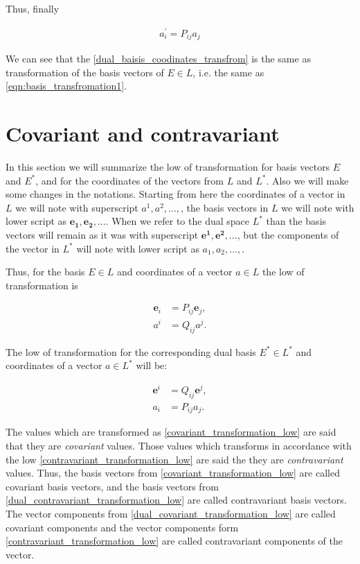 \documentclass{book}
\begin{document}
Thus, finally

\begin{align}
a_{i}^{'} = P_{ij}a_{j} \label{dual_baisis_coodinates_transfrom}
\end{align}

We can see that the \eqref{dual_baisis_coodinates_transfrom} is the same as transformation of the basis vectors of $E \in L$, i.e. the same as \eqref{eqn:basis_transfromation1}.

\section{Covariant and contravariant}
\label{section:covariant_contravariant}

In this section we will summarize the low of transformation for basis vectors $E$ and $E^*$, and for the coordinates of the vectors from $L$ and $L^*$. Also we will make some changes in the notations.
Starting from here the coordinates of a vector in $L$ we will note with superscript $a^1, a^2,...,$, the basis vectors in $L$ we will note with lower script as $\boldsymbol{e_1}, \boldsymbol{e_2},...$.
When we refer to the dual space $L^*$ than the basis vectors will remain as it was with superscript $\boldsymbol{e^1}, \boldsymbol{e^2},...$, but the components of the vector in $L^*$ will note with lower script as $a_1, a_2,...,$. 

Thus, for the basis $E \in L$ and coordinates of a vector $a \in L$ the low of transformation is

\begin{align}
\boldsymbol{e}_{i} &= P_{ij}\boldsymbol{e}_{j}, \label{covariant_transformation_low} \\
a^{i} &= Q_{ij}a^{j}. \label{contravariant_transformation_low}
\end{align}

The low of transformation for the corresponding dual basis $E^{*} \in L^{*}$ and coordinates of a vector $a \in L^*$ will be:

\begin{align}
\boldsymbol{e}^{i} &= Q_{ij}\boldsymbol{e}^{j}, \label{dual_contravariant_transformation_low} \\
a_{i} &= P_{ij}a_{j}. \label{dual_covariant_transformation_low}
\end{align}

The values which are transformed as \eqref{covariant_transformation_low} are said that they are \emph{covariant} values. Those values which transforms in accordance with the low \eqref{contravariant_transformation_low} are said the they are \emph{contravariant} values. Thus, the  basis vectors from \eqref{covariant_transformation_low} are called covariant basis vectors, and the basis vectors from \eqref{dual_contravariant_transformation_low} are called contravariant basis vectors. The vector components from \eqref{dual_covariant_transformation_low} are called covariant components and the vector components form \eqref{contravariant_transformation_low} are called  contravariant components of the vector.
\end{document}
